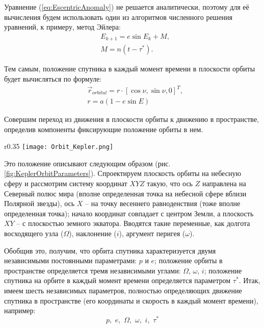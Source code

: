 Уравнение (\ref{eq:EscentricAnomaly}) не решается аналитически, поэтому для её
вычисления будем использовать один из алгоритмов численного решения уравнений, к примеру,
метод Эйлера:
\begin{equation}
  \begin{aligned}
    & E_{k+1} = e\sin E_k + M, \\
    & M = n(t - \tau^*).
  \end{aligned}
\end{equation}\par
Тем самым, положение спутника в каждый момент времени в плоскости орбиты
будет вычисляться по формуле:
\begin{equation}
  \begin{aligned}
    & \vec{r}_{orbital} = r \cdot [\cos\nu, \sin\nu, 0]^{T}, \\
    & r = a(1 - e\sin E)
  \end{aligned}
\end{equation}\par
Совершим переход из движения в плоскости орбиты к движению в пространстве, определив
компоненты фиксирующие положение орбиты в нем.
\begin{wrapfigure}{r}{0.35\textwidth}
  \texttt{[image: Orbit\_Kepler.png]}
  \caption{Кеплеровы элементы}
  \label{fig:KeplerOrbitParameters}
\end{wrapfigure}
Это положение описывают следующим образом (рис. \ref{fig:KeplerOrbitParameters}).
Спроектируем плоскость орбиты на небесную сферу и рассмотрим систему координат $XYZ$
такую, что ось $Z$ направлена на Северный полюс мира (вполне определенная точка
на небесной сфере вблизи Полярной звезды), ось $X$ -- на точку весеннего
равноденствия (тоже вполне определенная точка); начало координат совпадает с
центром Земли, а плоскость $XY$ -- с плоскостью земного экватора.
Вводятся такие переменные, как долгота восходящего узла ($\Omega$), наклонение ($i$),
аргумент перигея ($\omega$).\par
Обобщив это, получим, что орбита спутника характеризуется двумя независимыми постоянными
параметрами: $p$ и $e$; положение орбиты в пространстве определяется тремя независимыми
углами: $\Omega$, $\omega$, $i$; положение спутника на орбите в каждый момент времени
определяется параметром $\tau^*$. Итак, имеем шесть независимых параметров, полностью
определяющих движение спутника в пространстве (его координаты и скорость в каждый
момент времени), например:
\begin{equation} \label{eq:KeplerOrbitalElements}
  p,\,\, e,\,\, \Omega,\,\, \omega,\,\, i,\,\, \tau^*
\end{equation}
